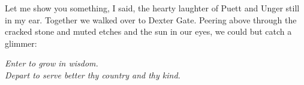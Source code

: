 \documentclass[12pt,letterpaper]{article}
\begin{document}
Let me show you something, I said, the hearty laughter of Puett and Unger still in my ear.  Together we walked over to Dexter Gate.  Peering above through the cracked stone and muted etches and the sun in our eyes, we could but catch a glimmer:

\begin{center}
\textit{Enter to grow in wisdom.}
\\
\textit{Depart to serve better thy country and thy kind.}
\end{center}

\pagebreak
%
%
%
%
%
%
%
%
%
%
%
%
\end{document}
